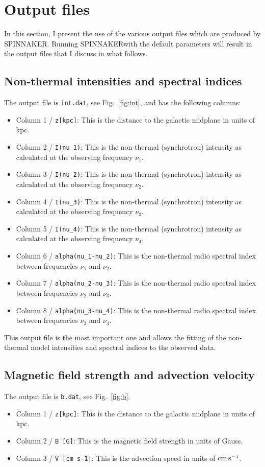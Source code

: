 \documentclass[11pt,twocolumn,a4paper]{article}
\newcommand\spix{{\small SPINNAKER}}
\begin{document}
\section{Output files}
In this section, I present the use of the various output files which are produced by \spix. Running \spix with the default parameters will result in the output files that I discuss in what follows.

\subsection {Non-thermal intensities and spectral indices}
The output file is {\tt int.dat}, see Fig.~\ref{fig:int}, and has the following columns:
\begin{itemize}
\item Column 1 / {\tt z[kpc]}: This is the distance to the galactic midplane in units of kpc.
\item Column 2 / {\tt I(nu\_1)}: This is the non-thermal (synchrotron) intensity as calculated at the observing frequency $\nu_1$.
\item Column 3 / {\tt I(nu\_2)}: This is the non-thermal (synchrotron) intensity as calculated at the observing frequency $\nu_2$.
\item Column 4 / {\tt I(nu\_3)}: This is the non-thermal (synchrotron) intensity as calculated at the observing frequency $\nu_3$.
\item Column 5 / {\tt I(nu\_4)}: This is the non-thermal (synchrotron) intensity as calculated at the observing frequency $\nu_4$.
\item Column 6 / {\tt alpha(nu\_1-nu\_2)}: This is the non-thermal radio spectral index between frequencies $\nu_1$ and $\nu_2$.
\item Column 7 / {\tt alpha(nu\_2-nu\_3)}: This is the non-thermal radio spectral index between frequencies $\nu_2$ and $\nu_3$.
\item Column 8 / {\tt alpha(nu\_3-nu\_4)}: This is the non-thermal radio spectral index between frequencies $\nu_3$ and $\nu_4$.
\end{itemize}

This output file is the most important one and allows the fitting of the non-thermal model intensities and spectral indices to the observed data. 

\subsection{Magnetic field strength and advection velocity}
The output file is {\tt b.dat}, see Fig.~\ref{fig:b}.
\begin{itemize}
\item Column 1 / {\tt z[kpc]}: This is the distance to the galactic midplane in units of kpc.
\item Column 2 / {\tt B [G]}: This is the magnetic field strength in units of Gauss.
\item Column 3 / {\tt V [cm~s\^-1]}: This is the advection speed in units of $\rm cm\,s^{-1}$.
\end{itemize}
\end{document}
